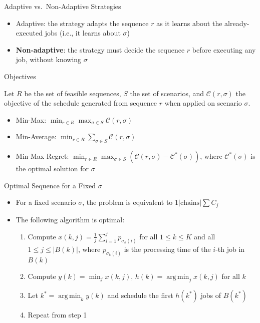 \documentclass[aspectratio=169]{beamer}
\DeclareMathOperator*{\argmin}{arg\,min}
\begin{document}
\begin{frame}{Adaptive vs.\ Non-Adaptive Strategies}

\begin{itemize}
    \item Adaptive: the strategy adapts the sequence \(r\) as it learns about the already-executed jobs (i.e., it learns about \(\sigma\))
    \item \textbf{Non-adaptive}: the strategy must decide the sequence \(r\) before executing any job, without knowing \(\sigma\)
\end{itemize}

\end{frame}


\begin{frame}{Objectives}

Let \(R\) be the set of feasible sequences, \(S\) the set of scenarios, and \(\mathcal{C}(r,\sigma)\) the objective of the schedule generated from sequence \(r\) when applied on scenario \(\sigma\).

\vspace{20pt}

\begin{itemize}
    \item Min-Max: \(\min_{r\in R} \max_{\sigma\in S} \mathcal{C}(r,\sigma)\)
    \item Min-Average: \(\min_{r\in R} \sum_{\sigma\in S} \mathcal{C}(r,\sigma)\)
    \item Min-Max Regret: \(\min_{r\in R} \max_{\sigma\in S} \left(\mathcal{C}(r,\sigma)-\mathcal{C}^*(\sigma)\right)\), where \(\mathcal{C}^*(\sigma)\) is the optimal solution for \(\sigma\)
\end{itemize}

\end{frame}


\begin{frame}{Optimal Sequence for a Fixed \(\sigma\)}

\begin{itemize}
    \item For a fixed scenario \(\sigma\), the problem is equivalent to \(1|\text{chains}|\sum C_j\)
    \item The following algorithm is optimal:
    \begin{enumerate}
        \item Compute \(x(k,j)=\frac{1}{j} \sum_{i=1}^j p_{\sigma_k(i)}\) for all \(1\le k\le K\) and all \(1\le j\le |B(k)|\), where \(p_{\sigma_k(i)}\) is the processing time of the \(i\)-th job in \(B(k)\)
        \item Compute \(y(k)=\min_j x(k,j)\), \(h(k)=\argmin_j x(k,j)\) for all \(k\)
        \item Let \(k^*=\argmin_k y(k)\) and schedule the first \(h(k^*)\) jobs of \(B(k^*)\)
        \item Repeat from step 1
    \end{enumerate}
\end{itemize}

\end{frame}
\end{document}
